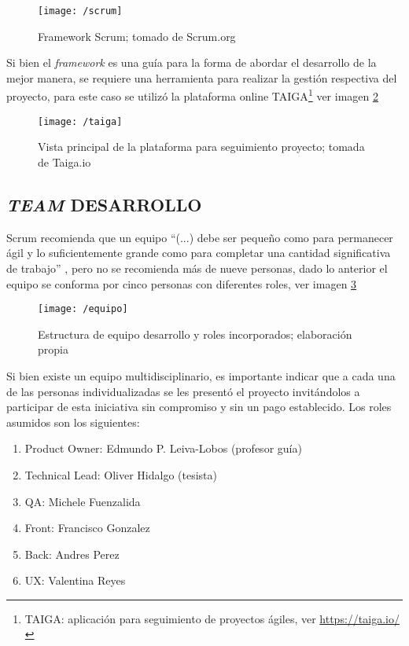 \begin{figure}[h]
\centering
\texttt{[image: /scrum]}
\caption{Framework Scrum; tomado de Scrum.org} 
\label{img4-1}
\end{figure}

Si bien el \textit{framework} es una guía para la forma de abordar el desarrollo de la mejor manera, se requiere una herramienta para realizar la gestión respectiva del proyecto, para este caso se utilizó la plataforma online TAIGA\footnote{TAIGA: aplicación para seguimiento de proyectos ágiles, ver \url{https://taiga.io/}} ver imagen \ref{img4-2}

\begin{figure}[!h]
\centering
\texttt{[image: /taiga]}
\caption{Vista principal de la plataforma para seguimiento proyecto; tomada de Taiga.io} 
\label{img4-2}
\end{figure}

\subsection{\textit{TEAM} DESARROLLO}

Scrum recomienda que un equipo “(...) debe ser pequeño como para permanecer ágil y lo suficientemente grande como para completar una cantidad significativa de trabajo” , pero no se recomienda más de nueve personas, dado lo anterior el equipo se conforma por cinco personas con diferentes roles, ver imagen \ref{img4-3}

\begin{figure}[!h]
\centering
\texttt{[image: /equipo]}
\caption{Estructura de equipo desarrollo y roles incorporados; elaboración propia} 
\label{img4-3}
\end{figure}

Si bien existe un equipo multidisciplinario, es importante indicar que a cada una de las personas individualizadas se les presentó el proyecto invitándolos a participar de esta iniciativa sin compromiso y sin un pago establecido. Los roles asumidos son los siguientes:

\begin{enumerate}[1.]
    \item Product Owner: Edmundo P. Leiva-Lobos (profesor guía)
    \item Technical Lead: Oliver Hidalgo (tesista)
    \item QA: Michele Fuenzalida
    \item Front: Francisco Gonzalez 
    \item Back: Andres Perez
    \item UX: Valentina Reyes
\end{enumerate}

